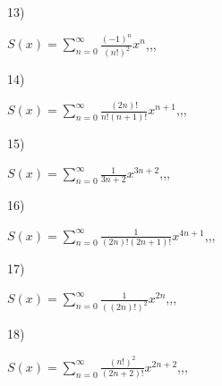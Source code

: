 \documentclass[11pt, ukrainian]{article}
\begin{document}
\par
\vspace{0.9cm}
13) \space 
{%
{$S(x)=\sum\limits_{n=0}^{\infty}{\frac{(-1)^n}{(n!)^2}}{x^{{n}}}$},,, \par \smallskip  
}
\par
\vspace{0.9cm}
14) \space 
{%
{$S(x)=\sum\limits_{n=0}^{\infty}{\frac{(2n)!}{n!(n+1)!}}{x^{{n+1}}}$},,, \par \smallskip  
}
\par
\vspace{0.9cm}
15) \space 
{%
{$S(x)=\sum\limits_{n=0}^{\infty}{\frac{1}{3n+2}}{x^{{3n+2}}}$},,, \par \smallskip  
}
\par
\vspace{0.9cm}
16) \space 
{%
{$S(x)=\sum\limits_{n=0}^{\infty}{\frac{1}{(2n)!(2n+1)!}}{x^{{4n+1}}}$},,, \par \smallskip  
}
\par
\vspace{0.9cm}
17) \space 
{%
{$S(x)=\sum\limits_{n=0}^{\infty}{\frac{1}{((2n)!)^2}}{x^{{2n}}}$},,, \par \smallskip  
}
\par
\vspace{0.9cm}
18) \space 
{%
{$S(x)=\sum\limits_{n=0}^{\infty}{\frac{(n!)^2}{(2n+2)!}}{x^{{2n+2}}}$},,, \par \smallskip  
}
\end{document}
